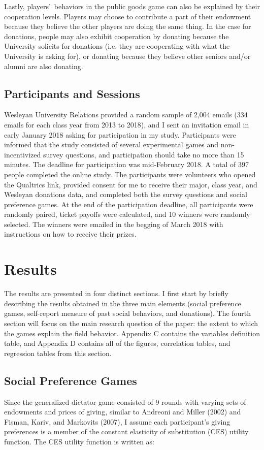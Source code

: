 \documentclass[12pt]{article}
\begin{document}
Lastly, players\rq \ behaviors in the public goods game can also be explained by their cooperation levels. Players may choose to contribute a part of their endowment because they believe the other players are doing the same thing. In the case for donations, people may also exhibit cooperation by donating because the University solicits for donations (i.e. they are cooperating with what the University is asking for), or donating because they believe other seniors and/or alumni are also donating.

	
\subsection{Participants and Sessions}

Wesleyan University Relations provided a random sample of 2,004 emails (334 emails for each class year from 2013 to 2018), and I sent an invitation email in early January 2018 asking for participation in my study. Participants were informed that the study consisted of several experimental games and non-incentivized survey questions, and participation should take no more than 15 minutes.  The deadline for participation was mid-February 2018. A total of 397 people completed the online study. The participants were volunteers who opened the Qualtrics link, provided consent for me to receive their major, class year, and Wesleyan donations data, and completed both the survey questions and social preference games. At the end of the participation deadline, all participants were randomly paired, ticket payoffs were calculated, and 10 winners were randomly selected. The winners were emailed  in the begging of March 2018 with instructions on how to receive their prizes.

\section{Results}
The results are presented in four distinct sections. I first start by briefly describing the results obtained in the three main elements (social preference games, self-report measure of past social behaviors, and donations). The fourth section will focus on the main research question of the paper: the extent to which the games explain the field behavior. Appendix C contains the variables definition table, and Appendix D contains all of the figures, correlation tables, and regression tables from this section.

\subsection{Social Preference Games}
Since the generalized dictator game consisted of 9 rounds with varying sets of endowments and prices of giving, similar to Andreoni and Miller (2002) and Fisman, Kariv, and Markovits (2007), I assume each participant\rq s giving preferences is a member of the constant elasticity of substitution (CES) utility function.  The CES utility function is written as:\\
\end{document}
